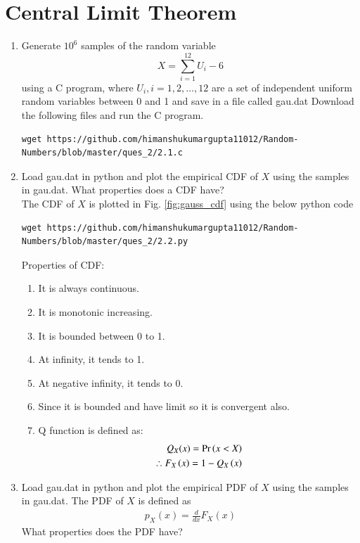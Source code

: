 \documentclass[journal,12pt,twocolumn]{IEEEtran}
\renewcommand\thesection{\arabic{section}}
\begin{document}
	\section{Central Limit Theorem}
	\begin{enumerate}[label=\thesection.\arabic*
		,ref=\thesection.\theenumi]
		\item
		Generate $10^6$ samples of the random variable
		\begin{equation}
			X = \sum_{i=1}^{12}U_i -6
		\end{equation}
		using a C program, where $U_i, i = 1,2,\dots, 12$ are  a set of independent uniform random variables between 0 and 1
		and save in a file called gau.dat
		\solution Download the following files and run the C program.
		\begin{lstlisting}
wget https://github.com/himanshukumargupta11012/Random-Numbers/blob/master/ques_2/2.1.c
		\end{lstlisting}
		\item
		Load gau.dat in python and plot the empirical CDF of $X$ using the samples in gau.dat. What properties does a CDF have?
		\\
		\solution The CDF of $X$ is plotted in Fig. \ref{fig:gauss_cdf}
		using the below python code
		\begin{lstlisting}
wget https://github.com/himanshukumargupta11012/Random-Numbers/blob/master/ques_2/2.2.py
		\end{lstlisting}
		Properties of CDF:
		\begin{enumerate}
			\item It is always continuous.
			\item It is monotonic increasing.
			\item It is bounded between 0 to 1.
			\item At infinity, it tends to 1.
			\item At negative infinity, it tends to 0.
			\item Since it is bounded and have limit so it is convergent also.
			\item Q function is defined as:
			\begin{align}
				Q_X(x)=\Pr\left(x<X\right)\\
				\therefore F_X\left(x\right)=1-Q_X\left(x\right)
			\end{align}
		\end{enumerate}
		
		\item
		Load gau.dat in python and plot the empirical PDF of $X$ using the samples in gau.dat. The PDF of $X$ is defined as
		\begin{align}
			p_{X}(x) = \frac{d}{dx}F_{X}(x)
		\end{align}
		What properties does the PDF have?
		

\end{enumerate}
\end{document}
